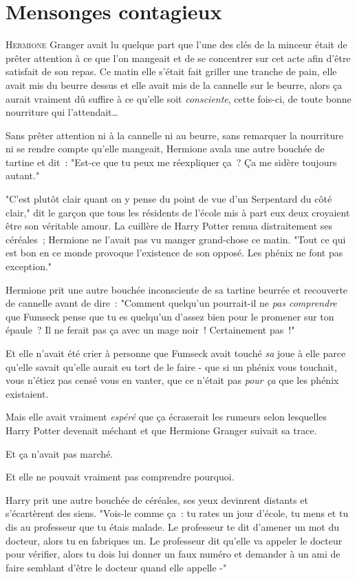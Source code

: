\chapter{Mensonges contagieux}

\lettrine{H}{ermione} Granger avait lu quelque part que l'une des clés de la minceur était de prêter attention à ce que l'on mangeait et de se concentrer sur cet acte afin d'être satisfait de son repas. Ce matin elle s'était fait griller une tranche de pain, elle avait mis du beurre dessus et elle avait mis de la cannelle sur le beurre, alors ça aurait vraiment dû suffire à ce qu'elle soit \emph{consciente}, cette fois-ci, de toute bonne nourriture qui l'attendait…

Sans prêter attention ni à la cannelle ni au beurre, sans remarquer la nourriture ni se rendre compte qu'elle mangeait, Hermione avala une autre bouchée de tartine et dit~: "Est-ce que tu peux me réexpliquer ça~? Ça me sidère toujours autant."

"C'est plutôt clair quant on y pense du point de vue d'un Serpentard du côté clair," dit le garçon que tous les résidents de l'école mis à part eux deux croyaient être son véritable amour. La cuillère de Harry Potter remua distraitement ses céréales~; Hermione ne l'avait pas vu manger grand-chose ce matin. "Tout ce qui est bon en ce monde provoque l'existence de son opposé. Les phénix ne font pas exception."

Hermione prit une autre bouchée inconsciente de sa tartine beurrée et recouverte de cannelle avant de dire~: "Comment quelqu'un pourrait-il ne \emph{pas comprendre} que Fumseck pense que tu es quelqu'un d'assez bien pour le promener sur ton épaule~? Il ne ferait pas ça avec un mage noir~! Certainement pas~!"

Et elle n'avait été crier à personne que Fumseck avait touché \emph{sa} joue à elle parce qu'elle savait qu'elle aurait eu tort de le faire - que si un phénix vous touchait, vous n'étiez pas censé vous en vanter, que ce n'était pas \emph{pour ça} que les phénix existaient.

Mais elle avait vraiment \emph{espéré} que ça écraserait les rumeurs selon lesquelles Harry Potter devenait méchant et que Hermione Granger suivait sa trace.

Et ça n'avait pas marché.

Et elle ne pouvait vraiment pas comprendre pourquoi.

Harry prit une autre bouchée de céréales, ses yeux devinrent distants et s'écartèrent des siens. "Vois-le comme ça~: tu rates un jour d'école, tu mens et tu dis au professeur que tu étais malade. Le professeur te dit d'amener un mot du docteur, alors tu en fabriques un. Le professeur dit qu'elle va appeler le docteur pour vérifier, alors tu dois lui donner un faux numéro et demander à un ami de faire semblant d'être le docteur quand elle appelle -"

